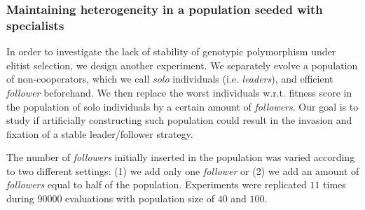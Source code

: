     \subsubsection{Maintaining heterogeneity in a population seeded with specialists}
      In order to investigate the lack of stability of genotypic polymorphism under elitist selection, we design another experiment. We separately evolve a population of non-cooperators, which we call \emph{solo} individuals (i.e. \emph{leaders}), and efficient \emph{follower} beforehand. We then replace the worst individuals w.r.t. fitness score in the population of solo individuals by a certain amount of \emph{followers}. Our goal is to study if artificially constructing such population could result in the invasion and fixation of a stable leader/follower strategy.

      The number of \emph{followers} initially inserted in the population was varied according to two different settings: (1) we add only one \emph{follower} or (2) we add an amount of \emph{followers} equal to half of the population. Experiments were replicated $11$ times during $90000$ evaluations with population size of $40$ and $100$.

      \begin{table}[hbtp]
        \caption{\textbf{Strategies evolved by the best individuals with elitist selection when adding \emph{followers}.} Repartition of the different strategies adopted by the best individuals at last evaluation in each of the replicates for different population sizes \(N\). We indicate in each cell the number of simulations where a particular strategy evolved. Populations were evolved under a \((\mu + \lambda)\) elitist selection, with \(\mu = \frac{N}{2}\) and \(\lambda = \frac{N}{2}\). The population was initially seeded with a population of \emph{solo} individuals in which we added a specific amount of \emph{followers}. In the table "L/F" stands for leader/follower and "NC" for "Non-Cooperative".}
        \label{tab:elitistInvasionStrategies}
      \end{table}


